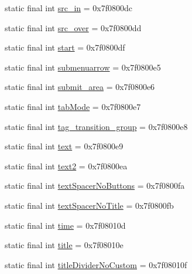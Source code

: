 \begin{DoxyCompactItemize}
\item 
static final int \mbox{\hyperlink{classcom_1_1synnapps_1_1carouselview_1_1_r_1_1id_a8a27c757b98c042e5ab153d31488e399}{src\+\_\+in}} = 0x7f0800dc
\item 
static final int \mbox{\hyperlink{classcom_1_1synnapps_1_1carouselview_1_1_r_1_1id_a407f198b44bb2f98d984772f1e7da352}{src\+\_\+over}} = 0x7f0800dd
\item 
static final int \mbox{\hyperlink{classcom_1_1synnapps_1_1carouselview_1_1_r_1_1id_af245f459b7f067016172edd3f9b5e5b0}{start}} = 0x7f0800df
\item 
static final int \mbox{\hyperlink{classcom_1_1synnapps_1_1carouselview_1_1_r_1_1id_a8f7885d64e80e8ca3851687069b4fdda}{submenuarrow}} = 0x7f0800e5
\item 
static final int \mbox{\hyperlink{classcom_1_1synnapps_1_1carouselview_1_1_r_1_1id_a25767b53ee8560b4c6df1d40d65ebdab}{submit\+\_\+area}} = 0x7f0800e6
\item 
static final int \mbox{\hyperlink{classcom_1_1synnapps_1_1carouselview_1_1_r_1_1id_a003bfc19c0e395292dcd8b013772c551}{tab\+Mode}} = 0x7f0800e7
\item 
static final int \mbox{\hyperlink{classcom_1_1synnapps_1_1carouselview_1_1_r_1_1id_ad949fe1676b80650ed277851b2ca3a84}{tag\+\_\+transition\+\_\+group}} = 0x7f0800e8
\item 
static final int \mbox{\hyperlink{classcom_1_1synnapps_1_1carouselview_1_1_r_1_1id_abd459983503ffe34287b6d56ab25246c}{text}} = 0x7f0800e9
\item 
static final int \mbox{\hyperlink{classcom_1_1synnapps_1_1carouselview_1_1_r_1_1id_a00d06bb5c6ab65984e495336768c347a}{text2}} = 0x7f0800ea
\item 
static final int \mbox{\hyperlink{classcom_1_1synnapps_1_1carouselview_1_1_r_1_1id_a7f8c2ba2f477ddaff9c425132108869b}{text\+Spacer\+No\+Buttons}} = 0x7f0800fa
\item 
static final int \mbox{\hyperlink{classcom_1_1synnapps_1_1carouselview_1_1_r_1_1id_a27d1faa9c263a578c4a12a9b02b201a7}{text\+Spacer\+No\+Title}} = 0x7f0800fb
\item 
static final int \mbox{\hyperlink{classcom_1_1synnapps_1_1carouselview_1_1_r_1_1id_a2ee1ea6440d40963c3dd2dc1fa6b51a1}{time}} = 0x7f08010d
\item 
static final int \mbox{\hyperlink{classcom_1_1synnapps_1_1carouselview_1_1_r_1_1id_ae48c6fd6d4883f9301fe9cd703586172}{title}} = 0x7f08010e
\item 
static final int \mbox{\hyperlink{classcom_1_1synnapps_1_1carouselview_1_1_r_1_1id_a1607a64a82ada52e79755b19d3ebf166}{title\+Divider\+No\+Custom}} = 0x7f08010f

\end{DoxyCompactItemize}
